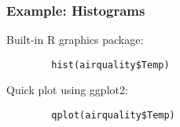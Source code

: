 \documentclass{beamer}
\begin{document}
	\begin{frame}[fragile]
		\frametitle{Example: Histograms}

		Built-in R graphics package:

		\vspace{2em}

		\begin{exampleblock}{}
		\begin{center}
		\begin{BVerbatim}
		hist(airquality$Temp)
		\end{BVerbatim}
		\end{center}
		\end{exampleblock}{}

		\vspace{2em}

		Quick plot using ggplot2:

		\vspace{2em}

		\begin{exampleblock}{}
		\begin{center}
		\begin{BVerbatim}
		qplot(airquality$Temp)
		\end{BVerbatim}
		\end{center}
		\end{exampleblock}{}

	\end{frame}
\end{document}
